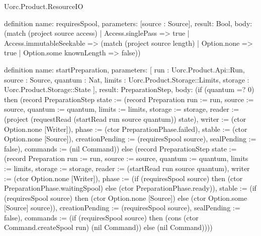 \begin{lexlean}{Uorc.Product.ResourceIO}
\begin{semanticmodule}
definition{
  name: requiresSpool,
  parameters: [source : Source],
  result: Bool,
  body: (match (project source access)
    | Access.singlePass => true
    | Access.immutableSeekable => (match (project source length)
      | Option.none => true
      | Option.some knownLength => false))
}

definition{
  name: startPreparation,
  parameters: [
    run : Uorc.Product.Api::Run,
    source : Source,
    quantum : Nat,
    limits : Uorc.Product.Storage::Limits,
    storage : Uorc.Product.Storage::State
  ],
  result: PreparationStep,
  body: (if (quantum =? 0) then (record PreparationStep {state := (record Preparation {run := run, source := source, quantum := quantum, limits := limits, storage := storage, reader := (project (requestRead (startRead run source quantum)) state), writer := (ctor Option.none [Writer]), phase := (ctor PreparationPhase.failed), stable := (ctor Option.none [Source]), creationPending := (requiresSpool source), sealPending := false}), commands := (nil Command)}) else (record PreparationStep {state := (record Preparation {run := run, source := source, quantum := quantum, limits := limits, storage := storage, reader := (startRead run source quantum), writer := (ctor Option.none [Writer]), phase := (if (requiresSpool source) then (ctor PreparationPhase.waitingSpool) else (ctor PreparationPhase.ready)), stable := (if (requiresSpool source) then (ctor Option.none [Source]) else (ctor Option.some [Source] source)), creationPending := (requiresSpool source), sealPending := false}), commands := (if (requiresSpool source) then (cons (ctor Command.createSpool run) (nil Command)) else (nil Command))}))
}


\end{semanticmodule}
\end{lexlean}
